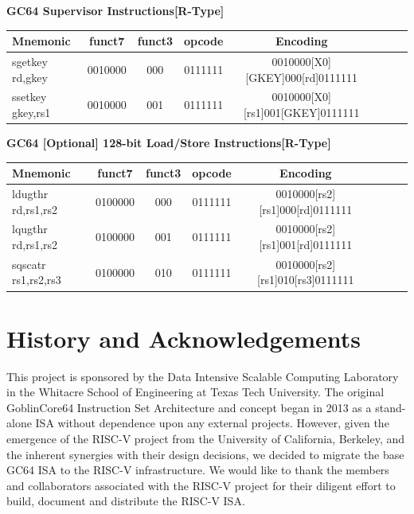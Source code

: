 \documentclass{article}
\begin{document}
\begin{center}
\begin{small}
\vspace{10 mm}

\textbf{GC64 Supervisor Instructions[R-Type]}
\begin{tabular}{| l | c | c | c | c | c | c || r}
\hline
Mnemonic & funct7 & funct3 & opcode & Encoding \\ \hline
\hline
sgetkey rd,gkey & 0010000 & 000 & 0111111 & 0010000[X0][GKEY]000[rd]0111111 \\ 
\hline
ssetkey gkey,rs1 & 0010000 & 001 & 0111111 & 0010000[X0][rs1]001[GKEY]0111111 \\ 
\hline
\end{tabular}

\vspace{10 mm}

\textbf{GC64 [Optional] 128-bit Load/Store Instructions[R-Type]}
\begin{tabular}{| l | c | c | c | c | c | c || r}
\hline
Mnemonic & funct7 & funct3 & opcode & Encoding \\ \hline
\hline
ldugthr rd,rs1,rs2 & 0100000 & 000 & 0111111 & 0010000[rs2][rs1]000[rd]0111111 \\ 
\hline
lqugthr rd,rs1,rs2 & 0100000 & 001 & 0111111 & 0010000[rs2][rs1]001[rd]0111111 \\ 
\hline
sqscatr rs1,rs2,rs3 & 0100000 & 010 & 0111111 & 0010000[rs2][rs1]010[rs3]0111111 \\ 
\hline
\end{tabular}

\end{small}
\end{center}


\section{History and Acknowledgements}

This project is sponsored by the Data Intensive Scalable Computing Laboratory in the Whitacre School of Engineering at Texas Tech University.  The original GoblinCore64 Instruction Set Architecture and concept began in 2013 as a stand-alone ISA without dependence upon any external projects.  However, given the emergence of the RISC-V project from the University of California, Berkeley, and the inherent synergies with their design decisions, we decided to migrate the base GC64 ISA to the RISC-V infrastructure.  We would like to thank the members and collaborators associated with the RISC-V project for their diligent effort to build, document and distribute the RISC-V ISA.  



\end{document}
